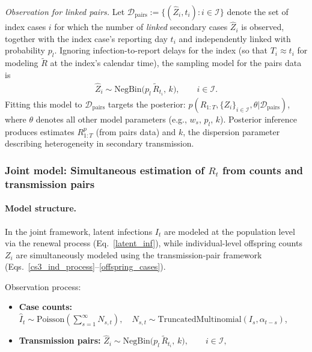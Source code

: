 \documentclass{article}
\begin{document}
\emph{Observation for linked pairs.} Let $\mathcal{D}_{\mathrm{pairs}}:=\{(\widehat{Z}_i, t_i): i\in\mathcal{I}\}$ denote the set of index cases $i$ for which the number of \emph{linked} secondary cases $\widehat{Z}_i$ is observed, together with the index case’s reporting day $t_i$ and independently linked with probability $p_l$. Ignoring infection-to-report delays for the index (so that $T_i \approx t_i$ for modeling $\tilde{R}$ at the index’s calendar time), the sampling model for the pairs data is 
\begin{align}
\widehat{Z}_i \sim\mathrm{NegBin}\!\big(p_l\,\tilde{R}_{t_i},\, k\big), 
\qquad i\in\mathcal{I}.
\end{align}
Fitting this model to $\mathcal{D}_{\mathrm{pairs}}$ targets the posterior: $\label{cs3_post_pairs}
p\left(R_{1:T}, \{Z_i\}_{i\in\mathcal{I}},\theta |\mathcal{D}_{\text{pairs}}\right)$, where $\theta$ denotes all other model parameters (e.g., $w_s$, $p_l$, $k$).  Posterior inference produces estimates $R_{1:T}^p$ (from pairs data) and $k$, the dispersion parameter describing heterogeneity in secondary transmission.

\subsubsection{Joint model: Simultaneous estimation of $R_{t}$ from counts and transmission pairs}

\paragraph{Model structure.}
In the joint framework, latent infections $I_t$ are modeled at the population level via the renewal process (Eq.~\eqref{latent_inf}), while individual-level offspring counts $Z_i$ are simultaneously modeled using the transmission-pair framework (Eqs.~\eqref{cs3_ind_process}--\eqref{offspring_cases}).  

Observation process:
\begin{itemize}
    \item \textbf{Case counts:} $\widehat{I}_t \sim \mathrm{Poisson}\left(\sum_{s=1}^\infty N_{s,t}\right), \quad N_{s,t} \sim \mathrm{TruncatedMultinomial}(I_s, \alpha_{t-s})$,

    \item \textbf{Transmission pairs:} $
    \widehat{Z}_i \sim \mathrm{NegBin}\!\big(p_l\,\tilde{R}_{t_i},\, k\big), 
    \qquad i\in\mathcal{I},$
\end{itemize}
\end{document}
